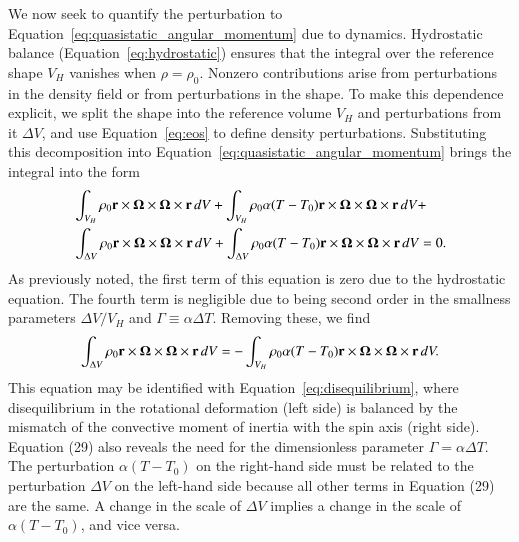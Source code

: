 \documentclass[preprint,12pt,authoryear]{elsarticle}
\newcommand{\mitbf}[1]{\hbox{\mathversion{bold}$#1$}}
\begin{document}
We now seek to quantify the perturbation to Equation~\eqref{eq:quasistatic_angular_momentum} due to dynamics.
Hydrostatic balance (Equation~\eqref{eq:hydrostatic}) ensures that the integral over the reference shape $V_H$ vanishes when $\rho = \rho_0$.
Nonzero contributions arise from perturbations in the density field or from perturbations in the shape.
To make this dependence explicit, we split the shape into the reference volume $V_H$ and perturbations from it $\Delta V$,
and use Equation~\eqref{eq:eos} to define density perturbations.
Substituting this decomposition into Equation~\eqref{eq:quasistatic_angular_momentum} brings the integral into the form
\begin{equation}
\begin{aligned}
&\int_{V_H} \rho_0 \mathbf{r} \times \mitbf{\Omega} \times \mitbf{\Omega} \times \mathbf{r} \,dV + 
\int_{V_H} \rho_0 \alpha (T-T_0) \mathbf{r} \times \mitbf{\Omega} \times \mitbf{\Omega} \times \mathbf{r} \,dV +  \\
&\int_{\Delta V} \rho_0 \mathbf{r} \times \mitbf{\Omega} \times \mitbf{\Omega} \times \mathbf{r} \,dV + 
\int_{\Delta V} \rho_0 \alpha (T-T_0) \mathbf{r} \times \mitbf{\Omega} \times \mitbf{\Omega} \times \mathbf{r} \,dV = 0.  \\
\end{aligned}
\end{equation}
As previously noted, the first term of this equation is zero due to the hydrostatic equation.  
The fourth term is negligible due to being second order in the smallness parameters $\Delta V/V_H$ and $\Gamma\equiv \alpha \Delta T$.
Removing these, we find
\begin{equation}
\begin{aligned}
\int_{\Delta V} \rho_0 \mathbf{r} \times \mitbf{\Omega} \times \mitbf{\Omega} \times \mathbf{r} \,dV = 
-\int_{V_H} \rho_0 \alpha (T-T_0) \mathbf{r} \times \mitbf{\Omega} \times \mitbf{\Omega} \times \mathbf{r} \,dV.
\end{aligned}
\end{equation}
This equation may be identified with Equation~\eqref{eq:disequilibrium}, 
where disequilibrium in the rotational deformation (left side) is balanced by the mismatch of the convective moment of inertia with the spin axis (right side). Equation (29) also reveals
the need for  the dimensionless parameter $\Gamma = \alpha \Delta T$. The perturbation  $\alpha(T-T_0)$ on the right-hand side must be related to the perturbation $\Delta V$ on the left-hand side because all other terms in Equation (29) are the same. A change in the scale of $\Delta V$ implies a change in the scale of $\alpha(T-T_0)$, and vice versa. 
\end{document}
